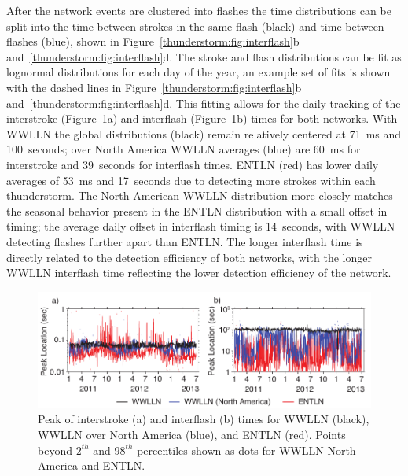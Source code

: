 After the network events are clustered into flashes the time distributions can be split into the time between strokes in the same flash (black) and time between flashes (blue), shown in Figure~\ref{thunderstorm:fig:interflash}b and~\ref{thunderstorm:fig:interflash}d.
The stroke and flash distributions can be fit as lognormal distributions for each day of the year, an example set of fits is shown with the dashed lines in Figure~\ref{thunderstorm:fig:interflash}b and~\ref{thunderstorm:fig:interflash}d.
This fitting allows for the daily tracking of the interstroke (Figure~\ref{thunderstorm:fig:stability}a) and interflash (Figure~\ref{thunderstorm:fig:stability}b) times for both networks.
With WWLLN the global distributions (black) remain relatively centered at 71~ms and 100~seconds; over North America WWLLN averages (blue) are 60~ms for interstroke and 39~seconds for interflash times.
ENTLN (red) has lower daily averages of 53~ms and 17~seconds due to detecting more strokes within each thunderstorm.
The North American WWLLN distribution more closely matches the seasonal behavior present in the ENTLN distribution with a small offset in timing; the average daily offset in interflash timing is 14~seconds, with WWLLN detecting flashes further apart than ENTLN. 
The longer interflash time is directly related to the detection efficiency of both networks, with the longer WWLLN interflash time reflecting the lower detection efficiency of the network.

\begin{figure}[ht!]
   \centering
   \includegraphics[scale=1]{thunderstorm/Figures/interflashStability.pdf}
   \caption{Peak of interstroke (a) and interflash (b) times for WWLLN (black), WWLLN over North America (blue), and ENTLN (red).
          Points beyond $2^{th}$ and $98^{th}$ percentiles shown as dots for WWLLN North America and ENTLN.}
   \label{thunderstorm:fig:stability}
\end{figure}

